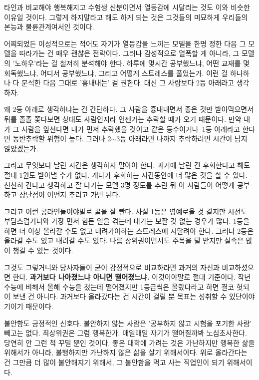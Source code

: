 타인과 비교해야 행복해지고 수험생 신분이면서 열등감에 시달리는 것도 이와 비슷한 이유일 것이다.
그렇게 하지말라고 해도 하게 되는 것은 그것들의 미묘하게 우리들의 본능과 불륜관계여서인 것이다.
\vspace{5mm}

어찌되었든 이성적으로는 적어도 자기가 열등감을 느끼는 모델을 한명 정한 다음 그 모델을 따라가는 건 매우 괜찮은 전략이다.
그러나 감성적으로 열폭할 게 아니라, 그 모델의 '노하우'라는 걸 철저히 분석해야 한다.
하루에 몇시간 공부했느냐, 어떤 교재를 몇회독했느냐, 어디서 공부했느냐, 그리고 어떻게 스트레스를 풀었는가.
이런 걸 하나하나 다 분석한 다음 그대로 '흉내내는' 걸 권한다.
대신 그 사람보다 2등 아래라고 생각하자.
\vspace{5mm}

왜 2등 아래로 생각하냐는 건 간단하다. 그 사람을 흉내내면서 좋은 것만 받아먹으면서 뒤를 졸졸 쫓다보면
상대도 사람인지라 언젠가는 추락할 때가 오기 때문이다. 만약 내가 그 사람을 앞선다면 내가 먼저 추락했을 것이고
같은 등수이거나 1등 아래라고 한다면 동반추락할 위험이 높다. 그러나 2$\sim$3등 아래라면 나까지 추락하려면 시간이 남지 않았겠는가.
\vspace{5mm}

그리고 무엇보다 날린 시간은 생각하지 말아야 한다.
과거에 날린 건 후회한다고 해도 절대 1원도 받아낼 수가 없다. 게다가 후회하는 시간동안에 더 많은 것을 할 수 있다.
천천히 간다고 생각하고 잘 나가는 모델 3명 정도를 추린 뒤 이 사람들이 어떻게 공부하고 장단점이 어떤지 추리고 가면 된다.
\vspace{5mm}

그리고 이런 콩라인들이야말로 꿀을 잘 빤다.
사실 1등은 영예로울 것 같지만 시선도 부담스럽거니와 가장 먼저 힘든 일을 겪는데 대가는 보잘 것 없는 경우가 많다.
1등을 하면 더 이상 올라갈 수도 없고 내려가야하는 스트레스에 시달려야 한다.
그러나 2등은 올라갈 수도 있고 내려갈 수도 있다. 나름 상위권이면서도 주목을 덜 받지만 실속은 많이 챙길 수 있는 것이다.
\vspace{5mm}

그것도 그렇거니와 당사자들이 굳이 감정적으로 비교하라면 과거의 자신과 비교하셨으면 한다.
\textbf{과거보다 나아졌느냐 아니면 떨어졌느냐.}
이것이야말로 절대 기준이다.
작년 수능에 비해서 올해 수능을 쳤는데 떨어졌지만 1등급씩은 올랐다라고 하면 결코 헛되이 보낸 건 아니다.
과거보다 올라갔다는 건 시간이 걸릴 뿐 목표는 성취할 수 있단이야기이기 때문이다.
\vspace{5mm}

불안함도 긍정적인 신호다. 불안하지 않는 사람은 '공부하지 않고 시험을 포기한 사람' 빼고는 없다.
최상위권은 그럼 행복한가. 매일매일 자기가 떨어질까봐 노심초사한다. 당연히 안 그런 척 꾸밀 뿐인 것이다.
좋은 대학에 가려는 것은 가난하지만 행복한 삶을 위해서가 아니라, 불행하지만 가난하지 않은 삶을 살기 위해서이다.
위로 올라간다는 건 그만큼 더 많이 불안해지기 위해서, 그 불안함을 먹고 사는 직업인이 되기 위해서이다.
\vspace{5mm}

